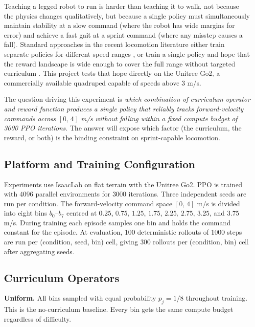 \documentclass[a4paper,11pt]{article}
\begin{document}
    Teaching a legged robot to run is harder than teaching it to walk, not because the physics changes qualitatively, but because a single policy must simultaneously maintain stability at a slow command (where the robot has wide margins for error) and achieve a fast gait at a sprint command (where any misstep causes a fall). Standard approaches in the recent locomotion literature either train separate policies for different speed ranges \cite{rudin2022}, or train a single policy and hope that the reward landscape is wide enough to cover the full range without targeted curriculum \cite{margolis2022}. This project tests that hope directly on the Unitree Go2, a commercially available quadruped capable of speeds above $3$ m/s.

    The question driving this experiment is \textit{which combination of curriculum operator and reward function produces a single policy that reliably tracks forward-velocity commands across $[0,\,4]$ m/s without falling within a fixed compute budget of 3000 PPO iterations.} The answer will expose which factor (the curriculum, the reward, or both) is the binding constraint on sprint-capable locomotion.

    \subsection{Platform and Training Configuration}

    Experiments use IsaacLab \cite{mittal2023} on flat terrain with the Unitree Go2. PPO \cite{schulman2017} is trained with $4096$ parallel environments for $3000$ iterations. Three independent seeds are run per condition. The forward-velocity command space $[0,\,4]$ m/s is divided into eight bins $b_0$--$b_7$ centred at $0.25$, $0.75$, $1.25$, $1.75$, $2.25$, $2.75$, $3.25$, and $3.75$ m/s. During training each episode samples one bin and holds the command constant for the episode. At evaluation, 100 deterministic rollouts of 1000 steps are run per (condition, seed, bin) cell, giving 300 rollouts per (condition, bin) cell after aggregating seeds.

    \subsection{Curriculum Operators}

    \textbf{Uniform.} All bins sampled with equal probability $p_j = 1/8$ throughout training. This is the no-curriculum baseline. Every bin gets the same compute budget regardless of difficulty.
\end{document}

